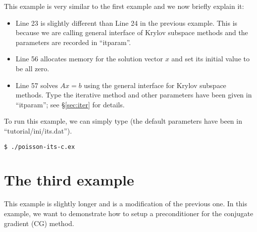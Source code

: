 \documentclass[11pt]{memoir}
\begin{document}
%
This example is very similar to the first example and we now briefly explain it:
\begin{itemize}
%
\item Line 23 is slightly different than Line 24 in the previous example. This is because we are calling general interface of Krylov subspace methods and the parameters are recorded in ``itparam''. 
%
\item Line 56 allocates memory for the solution vector $x$ and set its initial value to be all zero. 
%
\item Line 57 solves $Ax=b$ using the general interface for Krylov subspace methods. Type the iterative method and other parameters have been given in ``itparam''; see \S\ref{sec:iter} for details. 
%
\end{itemize}
%
To run this example, we can simply type (the default parameters have been in ``tutorial/ini/its.dat'').
%
\begin{lstlisting}[numbers=none]
$ ./poisson-its-c.ex
\end{lstlisting}

\section{The third example}\label{sec:ex3}

This example is slightly longer and is a modification of the previous one. In this example,  we want to demonstrate how to setup a preconditioner for the conjugate gradient (CG) method. 
\end{document}

